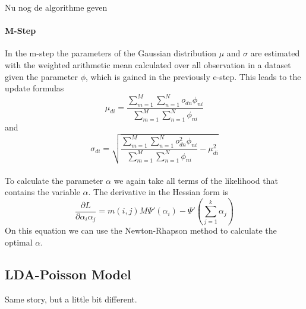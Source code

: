\documentclass[11pt,a4paper]{article}
\begin{document}
  Nu nog de algorithme geven

  \paragraph{M-Step}
  
In the m-step the parameters of the Gaussian distribution $\mu$ and $\sigma$ are estimated with the weighted arithmetic mean calculated over all observation in a dataset given the parameter $\phi$, which is gained in the previously e-step. This leads to the update formulas
\begin{equation}
 \mu_{di} = \frac{\sum_{m=1}^M \sum_{n=1}^N o_{dn} \phi_{ni} }{\sum_{m=1}^M \sum_{n=1}^N  \phi_{ni}}
\end{equation}
and
\begin{equation}
 \sigma_{di} = \sqrt{\frac{\sum_{m=1}^M \sum_{n=1}^N o_{dn}^2 \phi_{ni} }{\sum_{m=1}^M \sum_{n=1}^N  \phi_{ni}} - \mu_{di}^2}
\end{equation}
\\
To calculate the parameter $\alpha$ we again take all terms of the likelihood that contains the variable $\alpha$. The derivative in the Hessian form is
\begin{equation}
 \frac{\partial L}{\partial \alpha_i\alpha_j} =  m(i,j) M \Psi'(\alpha_i) - \Psi'(\sum_{j=1}^k \alpha_j)
\end{equation}
On this equation we can use the Newton-Rhapson method to calculate the optimal $\alpha$.

\subsection{LDA-Poisson Model}

Same story, but a little bit different.
\end{document}
